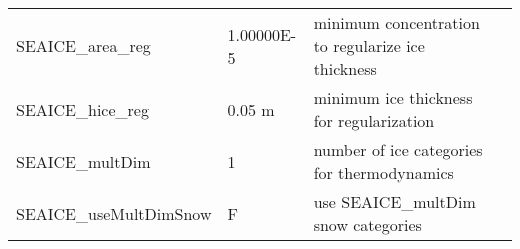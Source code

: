 \begin{table}[!ht]
{\begin{tabular}{|llp{5cm}c|}
    \\
   SEAICE\_area\_reg    &                   1.00000E-5
    &   minimum concentration to regularize ice thickness
    &  %
    \\
   SEAICE\_hice\_reg    &                   0.05 m
    &   minimum ice thickness for regularization
    &  %
    \\
    SEAICE\_multDim     &                  1
    & number of ice categories for thermodynamics
    &  %
    \\
    SEAICE\_useMultDimSnow &                  F
    & use SEAICE\_multDim snow categories
    &  %
    \\
\hline
\end{tabular}
}
\end{table}

